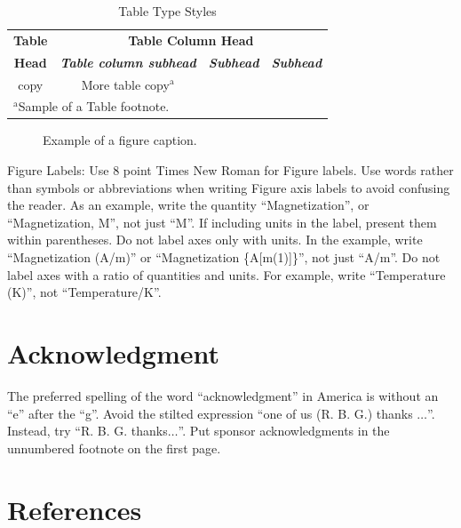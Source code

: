 \documentclass[conference]{IEEEtran}
\begin{document}
\begin{table}[htbp]
    \caption{Table Type Styles}
    \begin{center}
        \begin{tabular}{|c|c|c|c|}
            \hline
            \textbf{Table} & \multicolumn{3}{|c|}{\textbf{Table Column Head}}                                                         \\
            \cline{2-4}
            \textbf{Head}  & \textbf{\textit{Table column subhead}}           & \textbf{\textit{Subhead}} & \textbf{\textit{Subhead}} \\
            \hline
            copy           & More table copy$^{\mathrm{a}}$                   &                           &                           \\
            \hline
            \multicolumn{4}{l}{$^{\mathrm{a}}$Sample of a Table footnote.}
        \end{tabular}
        \label{tab1}
    \end{center}
\end{table}

\begin{figure}[htbp]
    \caption{Example of a figure caption.}
    \label{fig}
\end{figure}

Figure Labels: Use 8 point Times New Roman for Figure labels. Use words
rather than symbols or abbreviations when writing Figure axis labels to
avoid confusing the reader. As an example, write the quantity
``Magnetization'', or ``Magnetization, M'', not just ``M''. If including
units in the label, present them within parentheses. Do not label axes only
with units. In the example, write ``Magnetization (A/m)'' or ``Magnetization
\{A[m(1)]\}'', not just ``A/m''. Do not label axes with a ratio of
quantities and units. For example, write ``Temperature (K)'', not
``Temperature/K''.

\section*{Acknowledgment}

The preferred spelling of the word ``acknowledgment'' in America is without
an ``e'' after the ``g''. Avoid the stilted expression ``one of us (R. B.
G.) thanks $\ldots$''. Instead, try ``R. B. G. thanks$\ldots$''. Put sponsor
acknowledgments in the unnumbered footnote on the first page.

\section*{References}
\end{document}
